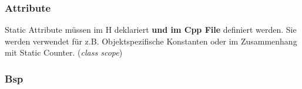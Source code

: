 \subsubsection{Attribute}

Static Attribute müssen im H deklariert \textbf{und im Cpp File} definiert werden. 
Sie werden verwendet für z.B. Objektspezifische Konstanten oder im Zusammenhang mit Static Counter. 
(\textit{class scope})

\subsubsection{Bsp}

